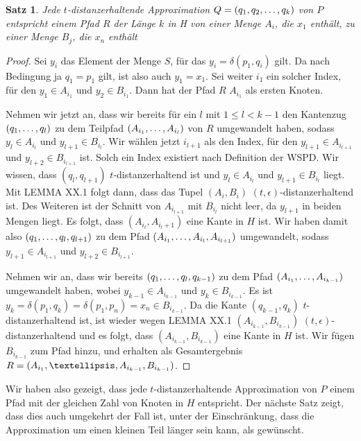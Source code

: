 \documentclass[11pt]{article}
\newtheorem{theorem}{Satz}[section]
\begin{document}
	\begin{theorem}
		\label{theo:Approx2H}
		Jede $t$-distanzerhaltende Approximation $Q = (q_1, q_2, \mathellipsis, q_k)$ von $P$ entspricht einem Pfad $R$ der Länge $k$ in H von einer Menge $A_i$, die $x_1$ enthält, zu einer Menge $B_j$, die $x_n$ enthält
	\end{theorem}
	\begin{proof}
		Sei $y_i$ das Element der Menge $S$, für das $y_i = \delta(p_1, q_i)$ gilt. Da nach Bedingung ja $q_1 = p_1$ gilt, ist also auch $y_1 = x_1$.
		Sei weiter $i_1$ ein solcher Index, für den $y_1 \in A_{i_1}$ und $y_2 \in B_{i_1}$. Dann hat der Pfad $R$ $A_{i_1}$ als ersten Knoten.
		
		Nehmen wir jetzt an, dass wir bereits für ein $l$ mit $1 \leq l < k-1$ den Kantenzug $(q_1, \mathellipsis, q_l)$ zu dem Teilpfad $(A_{i_1}, \mathellipsis, A_{i_l})$ von $R$ umgewandelt haben, sodass $y_l \in A_{i_l}$ und $y_{l+1} \in B_{i_l}$. Wir wählen jetzt $i_{l+1}$ als den Index, für den $y_{l+1} \in A_{i_{l+1}}$ und $y_{l+2} \in B_{i_{l+1}}$ ist. Solch ein Index existiert nach Definition der WSPD. Wir wissen, dass $(q_l, q_{l+1})$ $t$-distanzerhaltend ist und $y_l \in A_{i_l}$ und $y_{l+1} \in B_{i_l} $ liegt. Mit LEMMA XX.1 folgt dann, dass das Tupel $(A_i, B_i)$ $(t, \epsilon)$-distanzerhaltend ist. Des Weiteren ist der Schnitt von $A_{i_{l+1}}$ mit $B_{i_l}$ nicht leer, da $y_{l+1}$ in beiden Mengen liegt. Es folgt, dass $(A_{i_l}, A_{i_l+1})$ eine Kante in $H$ ist. Wir haben damit also $(q_1, \mathellipsis, q_l, q_{l+1})$ zu dem Pfad $(A_{i_1}, \mathellipsis, A_{i_l}, A_{i_{l+1}})$ umgewandelt, sodass $y_{l+1} \in A_{i_{l+1}}$ und $y_{l+2} \in B_{i_{l+1}}$.
		
		Nehmen wir an, dass wir bereits $(q_1, \mathellipsis, q_l, q_{k-1})$ zu dem Pfad $(A_{i_1}, \mathellipsis, A_{i_{k-1}})$ umgewandelt haben, wobei $y_{k-1} \in A_{i_{k-1}}$ und $y_k \in B_{i_{k-1}}$. Es ist $y_k = \delta(p_1, q_k) = \delta(p_1, p_n) = x_n \in B_{i_{k-1}}$. Da die Kante $(q_{k-1}, q_k)$ $t$-distanzerhaltend ist, ist wieder wegen LEMMA XX.1 $(A_{i_{k-1}}, B_{i_{k-1}})$ $(t, \epsilon)$-distanzerhaltend und es folgt, dass $(A_{i_{k-1}}, B_{i_{k-1}})$ eine Kante in $H$ ist. Wir fügen $B_{i_{k-1}}$ zum Pfad hinzu, und erhalten als Gesamtergebnis $R = (A_{i_1}, \textellipsis, A_{i_{k-1}}, B_{i_{k-1}})$.
	\end{proof}
	
	Wir haben also gezeigt, dass jede $t$-distanzerhaltende Approximation von $P$ einem Pfad mit der gleichen Zahl von Knoten in $H$ entspricht. Der nächste Satz zeigt, dass dies auch umgekehrt der Fall ist, unter der Einschränkung, dass die Approximation um einen kleinen Teil länger sein kann, als gewünscht.
	
\end{document}

